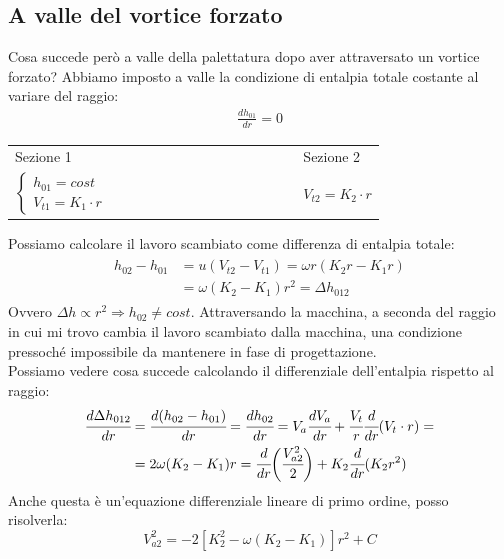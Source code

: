 \subsection{A valle del vortice forzato}
Cosa succede però a valle della palettatura dopo aver attraversato un vortice forzato? 
Abbiamo imposto a valle la condizione di entalpia totale costante al variare del raggio:
\begin{align*}
\frac{dh_{01}}{dr} = 0
\end{align*}
\begin{center}
\begin{tabular}{l l l l l l l l l l l l l l l}
	Sezione 1 & & & & & & & & & & & & & & Sezione 2\\
	$
	\begin{cases}
		h_{01} = cost\\
		V_{t1} = K_1 \cdot r
	\end{cases}$ & & & & & & & & & & & & & & $V_{t2} = K_2 \cdot r$
\end{tabular}
\end{center}
Possiamo calcolare il lavoro scambiato come differenza di entalpia totale:
\begin{align*}
\begin{split}
h_{02} - h_{01} &= u (V_{t2} - V_{t1} ) = \omega r (K_2 r - K_1 r) \\
&= \omega (K_2 - K_1) r^2 = \Delta h_{012}
\end{split}
\end{align*}
Ovvero $\Delta h \propto r^2 \Rightarrow h_{02} \neq  cost$. Attraversando la macchina, a seconda del raggio in cui mi trovo cambia il lavoro scambiato dalla macchina, una condizione pressoché impossibile da mantenere in fase di progettazione.\\
Possiamo vedere cosa succede calcolando il differenziale dell'entalpia rispetto al raggio:
\begin{align*}
\begin{split}
\cfrac{d \Delta h_{012}}{dr} &= \cfrac{d ( h_{02}-h_{01})}{dr} = \cfrac{dh_{02}}{dr} = V_a \cfrac{dV_a}{dr} + \cfrac{V_t}{r} \cfrac{d}{dr} (V_t \cdot r) = \\
& =2 \omega (K_2 - K_1) r = \cfrac{d}{dr} \bigg( \cfrac{V_{a2}^2}{2} \bigg) + K_2 \cfrac{d}{dr} (K_2 r^2)
\end{split}
\end{align*}
Anche questa è un'equazione differenziale lineare di primo ordine, posso risolverla:
\begin{equation}
\boxed{V_{a2}^2 = -2 \left[ K_2^2 - \omega \left( K_2 - K_1 \right) \right] r^2 + C}
\label{eq:valleVorticeForzato}
\end{equation}
